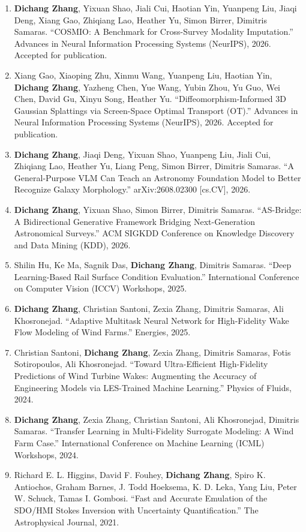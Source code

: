 \documentclass[11pt,letterpaper]{article}
\begin{document}
\begin{enumerate}
  \item \textbf{Dichang Zhang}, Yixuan Shao, Jiali Cui, Haotian Yin, Yuanpeng Liu, Jiaqi Deng, Xiang Gao, Zhiqiang Lao, Heather Yu, Simon Birrer, Dimitris Samaras. ``COSMIO: A Benchmark for Cross-Survey Modality Imputation.'' Advances in Neural Information Processing Systems (NeurIPS), 2026. Accepted for publication.
  \item Xiang Gao, Xiaoping Zhu, Xinmu Wang, Yuanpeng Liu, Haotian Yin, \textbf{Dichang Zhang}, Yazheng Chen, Yue Wang, Yubin Zhou, Yu Guo, Wei Chen, David Gu, Xinyu Song, Heather Yu. ``Diffeomorphism-Informed 3D Gaussian Splattings via Screen-Space Optimal Transport (OT).'' Advances in Neural Information Processing Systems (NeurIPS), 2026. Accepted for publication.
  \item \textbf{Dichang Zhang}, Jiaqi Deng, Yixuan Shao, Yuanpeng Liu, Jiali Cui, Zhiqiang Lao, Heather Yu, Liang Peng, Simon Birrer, Dimitris Samaras. ``A General-Purpose VLM Can Teach an Astronomy Foundation Model to Better Recognize Galaxy Morphology.'' arXiv:2608.02300 [cs.CV], 2026.
  \item \textbf{Dichang Zhang}, Yixuan Shao, Simon Birrer, Dimitris Samaras. ``AS-Bridge: A Bidirectional Generative Framework Bridging Next-Generation Astronomical Surveys.'' ACM SIGKDD Conference on Knowledge Discovery and Data Mining (KDD), 2026.
  \item Shilin Hu, Ke Ma, Sagnik Das, \textbf{Dichang Zhang}, Dimitris Samaras. ``Deep Learning-Based Rail Surface Condition Evaluation.'' International Conference on Computer Vision (ICCV) Workshops, 2025.
  \item \textbf{Dichang Zhang}, Christian Santoni, Zexia Zhang, Dimitris Samaras, Ali Khosronejad. ``Adaptive Multitask Neural Network for High-Fidelity Wake Flow Modeling of Wind Farms.'' Energies, 2025.
  \item Christian Santoni, \textbf{Dichang Zhang}, Zexia Zhang, Dimitris Samaras, Fotis Sotiropoulos, Ali Khosronejad. ``Toward Ultra-Efficient High-Fidelity Predictions of Wind Turbine Wakes: Augmenting the Accuracy of Engineering Models via LES-Trained Machine Learning.'' Physics of Fluids, 2024.
  \item \textbf{Dichang Zhang}, Zexia Zhang, Christian Santoni, Ali Khosronejad, Dimitris Samaras. ``Transfer Learning in Multi-Fidelity Surrogate Modeling: A Wind Farm Case.'' International Conference on Machine Learning (ICML) Workshops, 2024.
  \item Richard E. L. Higgins, David F. Fouhey, \textbf{Dichang Zhang}, Spiro K. Antiochos, Graham Barnes, J. Todd Hoeksema, K. D. Leka, Yang Liu, Peter W. Schuck, Tamas I. Gombosi. ``Fast and Accurate Emulation of the SDO/HMI Stokes Inversion with Uncertainty Quantification.'' The Astrophysical Journal, 2021.

\end{enumerate}
\end{document}
